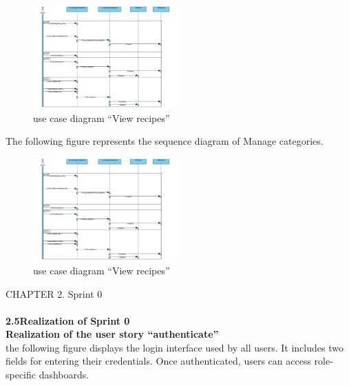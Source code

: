 \documentclass{article}
\begin{document}
{{{\begin{figure}[htbp]
    \centering
    \includegraphics[width=0.5\textwidth]{mandia}
    \caption{use case diagram “View recipes”}
    \label{fig:design2}
\end{figure}
The following figure represents the sequence diagram of Manage categories.\\
\begin{figure}[htbp]
    \centering
    \includegraphics[width=0.5\textwidth]{mandia}
    \caption{use case diagram “View recipes”}
    \label{fig:design2}
\end{figure}
\newpage
\noindent
CHAPTER 2.  Sprint 0 \\
\underline{\hspace{\textwidth}} \vspace{0.2cm}\\
 {\Large \textbf{2.5\hspace{1em}Realization of Sprint 0}}\vspace{0.2cm}\\

\textbf{Realization of the user story “authenticate”}\\
the following figure displays the login interface used by all users. It includes two fields for entering their credentials. Once authenticated, users can access role-specific dashboards.\\

}}}
\end{document}
